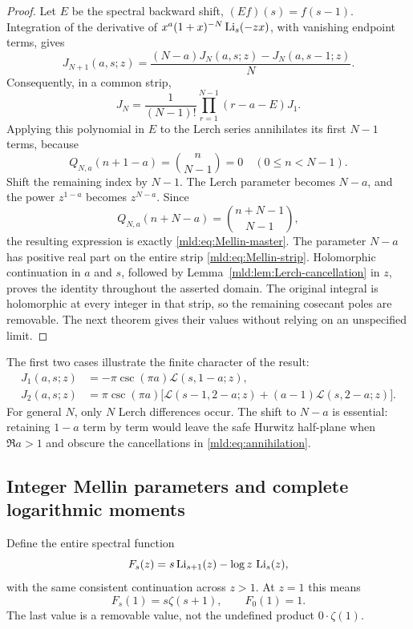 \begin{proof}
Let $E$ be the spectral backward shift, $(Ef)(s)=f(s-1)$. Integration of the derivative of $x^a(1+x)^{-N}\operatorname{Li}_s(-zx)$, with vanishing endpoint terms, gives
\begin{equation}\label{mld:eq:JN-recurrence}
 J_{N+1}(a,s;z)
       =\frac{(N-a)J_N(a,s;z)-J_N(a,s-1;z)}{N}.
\end{equation}
Consequently, in a common strip,
\[
 J_N=\frac1{(N-1)!}\prod_{r=1}^{N-1}(r-a-E)J_1.
\]
Applying this polynomial in $E$ to the Lerch series annihilates its first $N-1$ terms, because
\begin{equation}\label{mld:eq:annihilation}
 Q_{N,a}(n+1-a)=\binom n{N-1}=0
       \quad(0\le n<N-1).
\end{equation}
Shift the remaining index by $N-1$. The Lerch parameter becomes $N-a$, and the power $z^{1-a}$ becomes $z^{N-a}$. Since
\[
 Q_{N,a}(n+N-a)=\binom{n+N-1}{N-1},
\]
the resulting expression is exactly \eqref{mld:eq:Mellin-master}. The parameter $N-a$ has positive real part on the entire strip \eqref{mld:eq:Mellin-strip}. Holomorphic continuation in $a$ and $s$, followed by Lemma~\ref{mld:lem:Lerch-cancellation} in $z$, proves the identity throughout the asserted domain. The original integral is holomorphic at every integer in that strip, so the remaining cosecant poles are removable. The next theorem gives their values without relying on an unspecified limit.
\end{proof}

The first two cases illustrate the finite character of the result:
\begin{align}
 J_1(a,s;z)&=-\pi\csc(\pi a)\mathcal L(s,1-a;z),\label{mld:eq:J1}\\
 J_2(a,s;z)&=\pi\csc(\pi a)
       \big[\mathcal L(s-1,2-a;z)
                    +(a-1)\mathcal L(s,2-a;z)\big].\label{mld:eq:J2}
\end{align}
For general $N$, only $N$ Lerch differences occur. The shift to $N-a$ is essential: retaining $1-a$ term by term would leave the safe Hurwitz half-plane when $\Re a>1$ and obscure the cancellations in \eqref{mld:eq:annihilation}.

\subsection{Integer Mellin parameters and complete logarithmic moments}

Define the entire spectral function
\begin{equation}\label{mld:eq:F-definition}
 F_s(z)=s\operatorname{Li}_{s+1}(z)-\log z\,\operatorname{Li}_s(z),
\end{equation}
with the same consistent continuation across $z>1$. At $z=1$ this means
\begin{equation}\label{mld:eq:F-unit}
 F_s(1)=s\zeta(s+1),\qquad F_0(1)=1.
\end{equation}
The last value is a removable value, not the undefined product $0\cdot\zeta(1)$.

